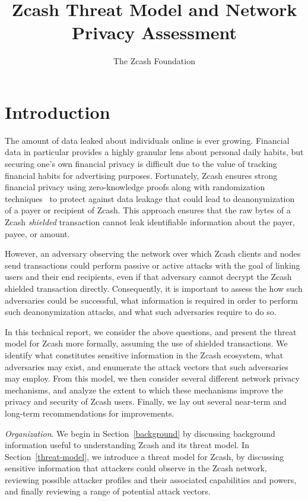 \documentclass{article}
\title{Zcash Threat Model and Network Privacy Assessment}
\author{The Zcash Foundation}
\begin{document}
    \maketitle
\section{Introduction}

The amount of data leaked about individuals online is ever growing.
Financial data in particular
provides a highly granular lens about personal daily habits, but securing one's
own financial privacy is difficult due to the value of tracking financial
habits for advertising purposes. Fortunately, Zcash ensures strong financial
privacy using zero-knowledge proofs along with randomization
techniques~\cite{zcash-spec} to
protect against data leakage that could lead to deanonymization of a payer or
recipient of Zcash. This approach ensures that the raw bytes of a
Zcash \emph{shielded} transaction cannot leak identifiable information about the
payer, payee, or amount.

However, an adversary observing the network over which Zcash clients and nodes
send transactions could perform passive or active attacks with the goal of
linking
users and their end recipients, even if that adversary cannot decrypt the Zcash
shielded transaction directly. Consequently, it is important to assess the
how such adversaries could be successful, what information is required in order
to perform such deanonymization attacks, and what such adversaries require to
do so.

In this technical report, we consider the above questions, and present the
threat model for Zcash more formally, assuming the use of shielded
transactions. We identify what constitutes sensitive information in the Zcash
ecosystem, what adversaries may exist, and enumerate the attack vectors that
such adversaries may employ. From this model, we then consider several
different network privacy mechanisms, and analyze the extent to which these
mechanisms improve the privacy and security of Zcash users. Finally, we lay out
several near-term and long-term recommendations for improvements.

\textit{Organization}.
We begin in Section~\ref{background} by discussing background information
useful to understanding Zcash and its threat model. In
Section~\ref{threat-model}, we introduce a threat model for Zcash, by
discussing sensitive information that attackers could observe in the Zcash
network, reviewing possible attacker profiles and their associated
capabilities and powers, and finally reviewing a range of potential attack
vectors.
\end{document}
